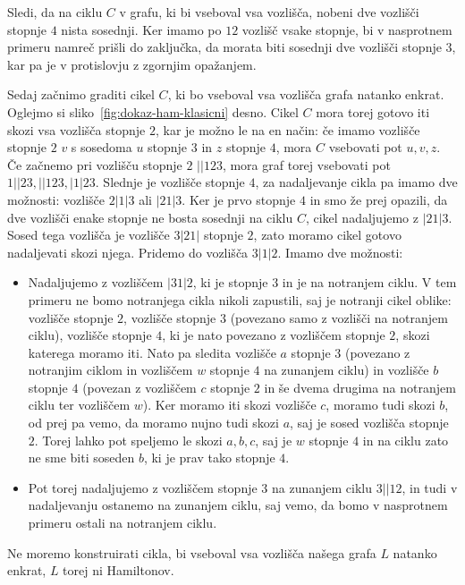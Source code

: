 \documentclass[12pt,a4paper]{amsart}
\theoremstyle{definition} %
\theoremstyle{plain} %
\begin{document}
    Sledi, da na ciklu $C$ v grafu, ki bi vseboval vsa vozlišča, nobeni dve vozlišči stopnje $4$ nista sosednji. Ker imamo po $12$ vozlišč vsake stopnje, bi v nasprotnem primeru namreč prišli do zaključka, da morata biti sosednji dve vozlišči stopnje $3$, kar pa je v protislovju z zgornjim opažanjem.
    
    Sedaj začnimo graditi cikel $C$, ki bo vseboval vsa vozlišča grafa natanko enkrat. Oglejmo si sliko~\ref{fig:dokaz-ham-klasicni} desno.
    Cikel $C$ mora torej gotovo iti skozi vsa vozlišča stopnje $2$, kar je možno le na en način: če imamo vozlišče stopnje $2$ $v$ s sosedoma $u$ stopnje $3$ in $z$ stopnje $4$, mora $C$ vsebovati pot $u,v,z$.
    Če začnemo pri vozlišču stopnje $2$ $||123$, mora graf torej vsebovati pot $1||23, ||123, |1|23$. Slednje je vozlišče stopnje $4$, za nadaljevanje cikla pa imamo dve možnosti: vozlišče $2|1|3$ ali $|21|3$. Ker je prvo stopnje $4$ in smo že prej opazili, da dve vozlišči enake stopnje ne bosta sosednji na ciklu $C$, cikel nadaljujemo z $|21|3$. Sosed tega vozlišča je vozlišče $3|21|$ stopnje $2$, zato moramo cikel gotovo nadaljevati skozi njega. Pridemo do vozlišča $3|1|2$. Imamo dve možnosti: 
    \begin{itemize}[label={--}]
        \item Nadaljujemo z vozliščem $|31|2$, ki je stopnje $3$ in je na notranjem ciklu. V tem primeru ne bomo notranjega cikla nikoli zapustili, saj je notranji cikel oblike: vozlišče stopnje $2$, vozlišče stopnje $3$ (povezano samo z vozlišči na notranjem ciklu), vozlišče stopnje $4$, ki je nato povezano z vozliščem stopnje $2$, skozi katerega moramo iti. Nato pa sledita vozlišče $a$ stopnje $3$ (povezano z notranjim ciklom in vozliščem $w$ stopnje $4$ na zunanjem ciklu) in vozlišče $b$ stopnje $4$ (povezan z vozliščem $c$ stopnje $2$ in še dvema drugima na notranjem ciklu ter vozliščem $w$). Ker moramo iti skozi vozlišče $c$, moramo tudi skozi $b$, od prej pa vemo, da moramo nujno tudi skozi $a$, saj je sosed vozlišča stopnje $2$. Torej lahko pot speljemo le skozi $a,b,c$, saj je $w$ stopnje $4$ in na ciklu zato ne sme biti soseden $b$, ki je prav tako stopnje $4$.
        \item Pot torej nadaljujemo z vozliščem stopnje $3$ na zunanjem ciklu $3||12$, in tudi v nadaljevanju ostanemo na zunanjem ciklu, saj vemo, da bomo v nasprotnem primeru ostali na notranjem ciklu.
    \end{itemize}
    Ne moremo konstruirati cikla, bi vseboval vsa vozlišča našega grafa $L$ natanko enkrat, $L$ torej ni Hamiltonov.
    \qedhere
\endproof
\end{document}
